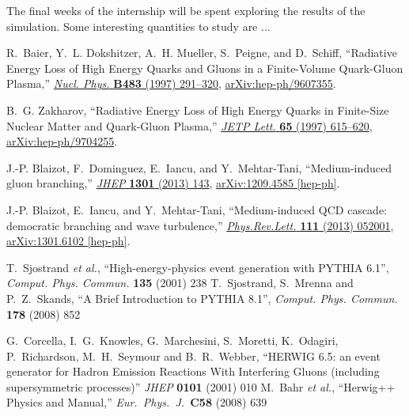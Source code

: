 \documentclass[a4paper,12pt]{article}
\numberwithin{equation}{section}
\begin{document}
The final weeks of the internship will be spent exploring the results of the simulation. Some interesting quantities to study are ...

 \begin{thebibliography}{10}
 
R.~Baier, Y.~L. Dokshitzer, A.~H. Mueller, S.~Peigne, and D.~Schiff,
  ``{Radiative Energy Loss of High Energy Quarks and Gluons in a Finite-Volume
  Quark-Gluon Plasma},''
  \href{http://dx.doi.org/10.1016/S0550-3213(96)00553-6}{{\em Nucl. Phys.}
  {\bfseries B483} (1997) 291--320},
\href{http://arxiv.org/abs/hep-ph/9607355}{{\ttfamily arXiv:hep-ph/9607355}}.

B.~G. Zakharov, ``{Radiative Energy Loss of High Energy Quarks in Finite-Size
  Nuclear Matter and Quark-Gluon Plasma},''
  \href{http://dx.doi.org/10.1134/1.567389}{{\em JETP Lett.} {\bfseries 65}
  (1997) 615--620},
\href{http://arxiv.org/abs/hep-ph/9704255}{{\ttfamily arXiv:hep-ph/9704255}}.

J.-P. Blaizot, F.~Dominguez, E.~Iancu, and Y.~Mehtar-Tani, ``{Medium-induced
  gluon branching},'' \href{http://dx.doi.org/10.1007/JHEP01(2013)143}{{\em
  JHEP} {\bfseries 1301} (2013) 143},
\href{http://arxiv.org/abs/1209.4585}{{\ttfamily arXiv:1209.4585 [hep-ph]}}.


J.-P. Blaizot, E.~Iancu, and Y.~Mehtar-Tani, ``{Medium-induced QCD cascade:
  democratic branching and wave turbulence},''
  \href{http://dx.doi.org/10.1103/PhysRevLett.111.052001}{{\em Phys.Rev.Lett.}
  {\bfseries 111} (2013) 052001},
\href{http://arxiv.org/abs/1301.6102}{{\ttfamily arXiv:1301.6102 [hep-ph]}}.





  T.~Sjostrand {\it et al.},
  ``{High-energy-physics event generation with PYTHIA 6.1}'',
  {\it Comput. Phys. Commun.}  {\bf 135} (2001) 238 
  T.~Sjostrand, S.~Mrenna and P.~Z.~Skands,
  ``{A Brief Introduction to PYTHIA 8.1}'',
  {\it Comput. Phys. Commun.}  {\bf 178} (2008) 852

  G.~Corcella, I.~G.~Knowles, G.~Marchesini, S.~Moretti, K.~Odagiri, P.~Richardson, M.~H.~Seymour and B.~R.~Webber,
  ``HERWIG 6.5: an event generator for Hadron Emission Reactions With Interfering Gluons (including supersymmetric processes)'' {\it JHEP} {\bf 0101} (2001) 010 %
  M.~Bahr {\it et al.},
  ``Herwig++ Physics and Manual,''
  {\it Eur.\ Phys.\ J.\ }{\bf C58} (2008) 639





\end{thebibliography}
\end{document}

